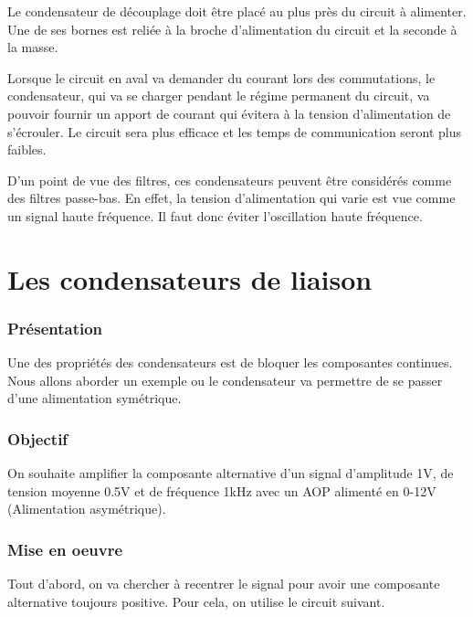 Le condensateur de découplage doit être placé au plus près du circuit à alimenter. Une de ses bornes est reliée à la broche d'alimentation du circuit et la seconde à la masse. \n


Lorsque le circuit en aval va demander du courant lors des commutations, le condensateur, qui va se charger pendant le régime permanent du circuit, va pouvoir fournir un apport de courant qui évitera à la tension d'alimentation de s'écrouler. Le circuit sera plus efficace et les temps de communication seront plus faibles. \n


D'un point de vue des filtres, ces condensateurs peuvent être considérés comme des filtres passe-bas. En effet, la tension d'alimentation qui varie est vue comme un signal haute fréquence. Il faut donc éviter l'oscillation haute fréquence.

\section{Les condensateurs de liaison}

\subsubsection{Présentation}

Une des propriétés des condensateurs est de bloquer les composantes continues.
Nous allons aborder un exemple ou le condensateur va permettre de se passer d'une alimentation symétrique. 

\subsubsection{Objectif}

On souhaite amplifier la composante alternative d'un signal d'amplitude 1V, de tension moyenne 0.5V et de fréquence 1kHz avec un AOP alimenté en 0-12V (Alimentation asymétrique).


\subsubsection{Mise en oeuvre}

Tout d'abord, on va chercher à recentrer le signal pour avoir une composante alternative toujours positive.
Pour cela, on utilise le circuit suivant.

